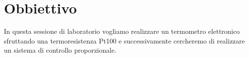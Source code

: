 \section*{Obbiettivo}

In questa sessione di laboratorio vogliamo realizzare un termometro elettronico sfruttando una termoresistenza Pt100 e successivamente cercheremo di realizzare un sistema di controllo proporzionale.
